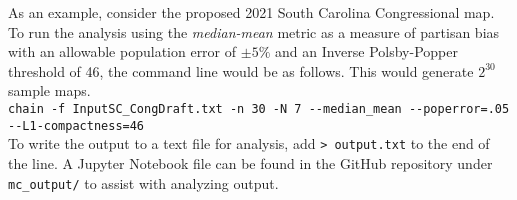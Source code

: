 \documentclass[11pt]{article}
\begin{document}
As an example, consider the proposed 2021 South Carolina Congressional map. To run the analysis using the \textit{median-mean} metric as a measure of partisan bias with an allowable population error of $\pm 5\%$ and an Inverse Polsby-Popper threshold of 46, the command line would be as follows. This would generate $2^{30}$ sample maps.\\

\verb|chain -f InputSC_CongDraft.txt -n 30 -N 7 --median_mean --poperror=.05|\\
\verb|--L1-compactness=46|\\

To write the output to a text file for analysis, add \verb|> output.txt| to the end of the line. A Jupyter Notebook file can be found in the GitHub repository under \verb|mc_output/| to assist with analyzing output.
\end{document}

